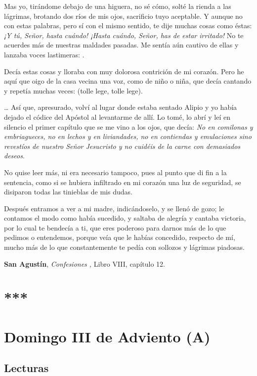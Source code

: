 Mas yo, tirándome debajo de una higuera, no sé cómo, solté la rienda a las lágrimas, brotando dos ríos de mis ojos, sacrificio tuyo aceptable. Y aunque no con estas palabras, pero sí con el mismo sentido, te dije muchas cosas como éstas: \emph{¡Y tú, Señor, hasta cuándo! ¡Hasta cuándo, Señor, has de estar irritado!} No te acuerdes más de nuestras maldades pasadas. Me sentía aún cautivo de ellas y lanzaba voces lastimeras: .

Decía estas cosas y lloraba con muy dolorosa contrición de mi corazón. Pero he aquí que oigo de la casa vecina una voz, como de niño o niña, que decía cantando y repetía muchas veces:  (tolle lege, tolle lege).

\ldots{} Así que, apresurado, volví al lugar donde estaba sentado Alipio y yo había dejado el códice del Apóstol al levantarme de allí. Lo tomé, lo abrí y leí en silencio el primer capítulo que se me vino a los ojos, que decía: \emph{No en comilonas y embriagueces, no en lechos y en liviandades, no en contiendas y emulaciones sino revestíos de nuestro Señor Jesucristo y no cuidéis de la carne con demasiados deseos}.

No quise leer más, ni era necesario tampoco, pues al punto que di fin a la sentencia, como si se hubiera infiltrado en mi corazón una luz de seguridad, se disiparon todas las tinieblas de mis dudas.

Después entramos a ver a mi madre, indicándoselo, y se llenó de gozo; le contamos el modo como había sucedido, y saltaba de alegría y cantaba victoria, por lo cual te bendecía a ti, que eres poderoso para darnos más de lo que pedimos o entendemos, porque veía que le habías concedido, respecto de mí, mucho más de lo que constantemente te pedía con sollozos y lágrimas piadosas.

\textbf{San Agustín}, \emph{Confesiones ,} Libro VIII, capítulo 12.

\chapter{***}
\chapter{Domingo III de Adviento (A)}

\section{Lecturas}

